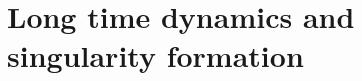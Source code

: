 \documentclass[10pt]{article}
\theoremstyle{definition}
\theoremstyle{remark}
\numberwithin{equation}{section}
\newcommand{\nrm}[1]{\Vert#1\Vert}
\newcommand{\rd}{\partial}
\newcommand{\0}{\emptyset}
\newcommand{\tht}{\theta}
\newcommand{\varep}{\varepsilon}
\newcommand{\bbS}{\mathbb S}
\newcommand{\calM}{\mathcal M}
\begin{document}

  
	\section{Long time dynamics and singularity formation}\label{sec:longtime}
	
\end{document}
